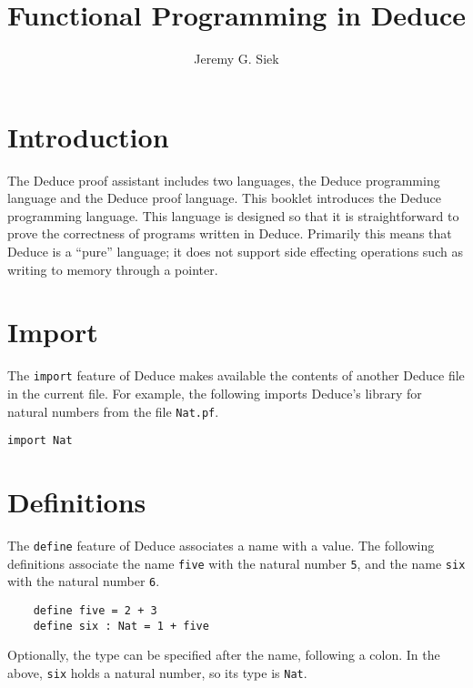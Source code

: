 \documentclass[12pt]{article}
\title{Functional Programming in Deduce}
\author{Jeremy G. Siek}
\begin{document}
\maketitle


\tableofcontents

\pagebreak

\large

\section{Introduction}

The Deduce proof assistant includes two languages, the Deduce
programming language and the Deduce proof language. This booklet
introduces the Deduce programming language. This language is designed
so that it is straightforward to prove the correctness of programs
written in Deduce. Primarily this means that Deduce is a ``pure''
language; it does not support side effecting operations such as
writing to memory through a pointer.

\section{Import}

The \texttt{import} feature of Deduce makes available the contents of
another Deduce file in the current file. For example, the following
imports Deduce's library for natural numbers from the file
\texttt{Nat.pf}.

\begin{verbatim}
import Nat
\end{verbatim}

\section{Definitions}

The \texttt{define} feature of Deduce associates a name with a value.
The following definitions associate the name \texttt{five} with the
natural number \texttt{5}, and the name \texttt{six} with the natural
number \texttt{6}.

\begin{verbatim}
    define five = 2 + 3
    define six : Nat = 1 + five
\end{verbatim}

\noindent Optionally, the type can be specified after the name,
following a colon.  In the above, \texttt{six} holds a natural number,
so its type is \texttt{Nat}.
\end{document}
